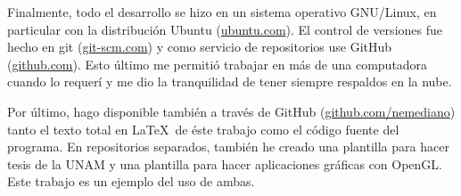 Finalmente, todo el desarrollo se hizo en un sistema operativo GNU/Linux, en particular con la distribución Ubuntu (\href{https://ubuntu.com/}{ubuntu.com}).
El control de versiones fue hecho en git (\href{https://git-scm.com/}{git-scm.com}) y como servicio de repositorios use GitHub (\href{https://github.com/}{github.com}).
Esto último me permitió trabajar en más de una computadora cuando lo requerí y me dio la tranquilidad de tener siempre respaldos en la nube.

Por último, hago disponible también a través de GitHub (\href{https://github.com/nemediano}{github.com/nemediano}) tanto el texto total en \LaTeX~de éste trabajo como el código fuente del programa.
En repositorios separados, también he creado una plantilla para hacer tesis de la UNAM y una plantilla para hacer aplicaciones gráficas con OpenGL.
Este trabajo es un ejemplo del uso de ambas.

